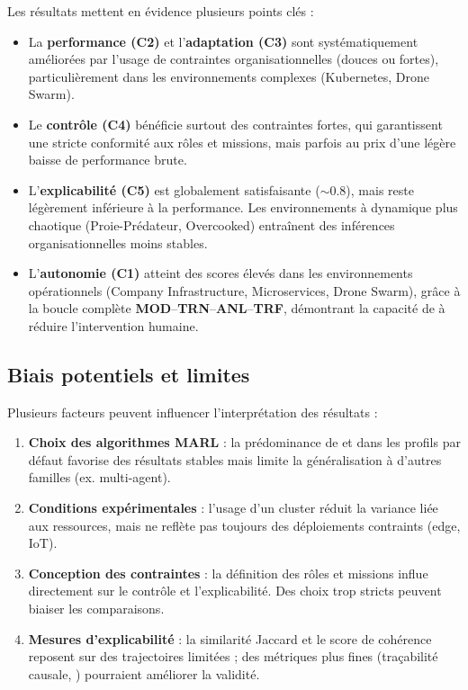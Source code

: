 Les résultats mettent en évidence plusieurs points clés :
\begin{itemize}
  \item La \textbf{performance (C2)} et l’\textbf{adaptation (C3)} sont systématiquement améliorées par l’usage de contraintes organisationnelles (douces ou fortes), particulièrement dans les environnements complexes (Kubernetes, Drone Swarm).
  \item Le \textbf{contrôle (C4)} bénéficie surtout des contraintes fortes, qui garantissent une stricte conformité aux rôles et missions, mais parfois au prix d’une légère baisse de performance brute.
  \item L’\textbf{explicabilité (C5)} est globalement satisfaisante ($\sim 0.8$), mais reste légèrement inférieure à la performance. Les environnements à dynamique plus chaotique (Proie-Prédateur, Overcooked) entraînent des inférences organisationnelles moins stables.
  \item L’\textbf{autonomie (C1)} atteint des scores élevés dans les environnements opérationnels (Company Infrastructure, Microservices, Drone Swarm), grâce à la boucle complète \textbf{MOD}–\textbf{TRN}–\textbf{ANL}–\textbf{TRF}, démontrant la capacité de  à réduire l’intervention humaine.
\end{itemize}

\subsection{Biais potentiels et limites}

Plusieurs facteurs peuvent influencer l’interprétation des résultats :
\begin{enumerate}[label={\alph*)}]
  \item \textbf{Choix des algorithmes MARL} : la prédominance de  et  dans les profils par défaut favorise des résultats stables mais limite la généralisation à d’autres familles (ex.  multi-agent).
  \item \textbf{Conditions expérimentales} : l’usage d’un cluster  réduit la variance liée aux ressources, mais ne reflète pas toujours des déploiements contraints (edge, IoT).
  \item \textbf{Conception des contraintes} : la définition des rôles et missions influe directement sur le contrôle et l’explicabilité. Des choix trop stricts peuvent biaiser les comparaisons.
  \item \textbf{Mesures d’explicabilité} : la similarité Jaccard et le score de cohérence reposent sur des trajectoires limitées ; des métriques plus fines (traçabilité causale, ) pourraient améliorer la validité.
\end{enumerate}

